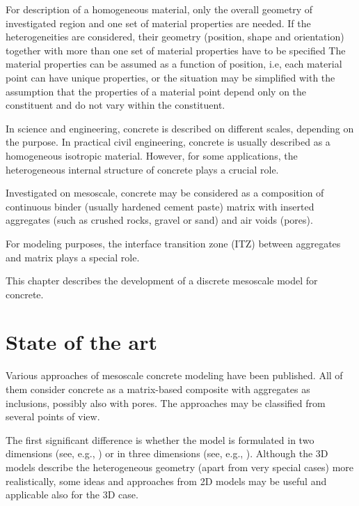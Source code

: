 For description of a homogeneous material, only the overall geometry of investigated region and one set of material properties are needed.
If the heterogeneities are considered, their geometry (position, shape and orientation) together with more than one set of material properties have to be specified
The material properties can be assumed as a function of position, i.e, each material point can have unique properties, or the situation may be simplified with the assumption that the properties of a material point depend only on the constituent and do not vary within the constituent.

In science and engineering, concrete is described on different scales, depending on the purpose.
In practical civil engineering, concrete is usually described as a homogeneous isotropic material.
However, for some applications, the heterogeneous internal structure of concrete plays a crucial role.

Investigated on mesoscale, concrete may be considered as a composition of continuous binder (usually hardened cement paste) matrix with inserted aggregates (such as crushed rocks, gravel or sand) and air voids (pores).

For modeling purposes, the interface transition zone (ITZ) between aggregates and matrix plays a special role.

This chapter describes the development of a discrete mesoscale model for concrete.





\chapter{State of the art}\label{chapMCPMStateOfTheArt}
Various approaches of mesoscale concrete modeling have been published.
All of them consider concrete as a matrix-based composite with aggregates as inclusions, possibly also with pores.
The approaches may be classified from several points of view.

The first significant difference is whether the model is formulated in two dimensions (see, e.g.,
\cite{%
	AzevedoLemosAlmeida2008a,%
	HafnerEckardtLutherKonke2006a,%
	WangKwanChan1999a,%
	LeiteSlowikApel2007a,%
	LeiteSlowikMihashi2004a,%
	MagnierDonze1998a,%
	PanFengJinXuSunZhangOwen2013a,%
	PedersenSimoneSluys2013a,%
	SatohYamadaIshiyama2013a,%
	WangLinGu2008a,%
	XuHaoLi2012a,%
	ZhouHao2008a,%
	ZhouHao2008b,%
	QinZhang2011a,%
	GuHongWangLin2013a,%
	GrasslJirasek2010a,%
	GrasslRempling2008a,%
	ZhuTang2002a,%
	GhoshChaudhuri2013a%
}) or in three dimensions (see, e.g.,
\cite{%
	CombypeyrotBernardBouchardBayGarciadiaz2009a,%
	LeiteSlowikApel2007a,%
	LeiteSlowikApel2007a,%
	ShahbeykHosseiniYaghoobi2011a,%
	TranDonzeMarin2011a,%
	WriggersMoftah2006,%
	KimAlrub2011a,%
	CaballeroWillamCarol2008a,%
	YipLiLiaoBolander2006a,%
	Marangi2010a,%
	Cusatis2001a,%
	CusatisBazantCedolin2006a,%
	CusatisPelessoneMencarelli2011a,%
	CusatisMencarelliPelessoneBaylot2011a,%
	Kozicki2007a,%
	LandisBolander2009a,%
	AsahinaLandisBolander2011a%
}).
Although the 3D models describe the heterogeneous geometry (apart from very special cases) more realistically, some ideas and approaches from 2D models may be useful and applicable also for the 3D case.

